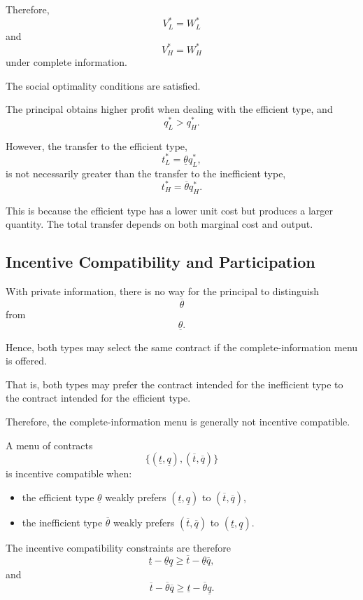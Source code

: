 Therefore,
\[
V^*_L=W^*_L
\]
and
\[
V^*_H=W^*_H
\]
under complete information.

The social optimality conditions are satisfied.

The principal obtains higher profit when dealing with the efficient type, and
\[
q^*_L>q^*_H.
\]

However, the transfer to the efficient type,
\[
t^*_L=\underline{\theta}q^*_L,
\]
is not necessarily greater than the transfer to the inefficient type,
\[
t^*_H=\overline{\theta}q^*_H.
\]

This is because the efficient type has a lower unit cost but produces a larger quantity. The total transfer depends on both marginal cost and output.



\subsection{Incentive Compatibility and Participation}

With private information, there is no way for the principal to distinguish
\[
\overline{\theta}
\]
from
\[
\underline{\theta}.
\]

Hence, both types may select the same contract if the complete-information menu is offered.

That is, both types may prefer the contract intended for the inefficient type to the contract intended for the efficient type.

Therefore, the complete-information menu is generally not incentive compatible.

A menu of contracts
\[
\{(\underline t,\underline q),(\overline t,\overline q)\}
\]
is incentive compatible when:

\begin{itemize}
    \item the efficient type \(\underline{\theta}\) weakly prefers \((\underline t,\underline q)\) to \((\overline t,\overline q)\),
    \item the inefficient type \(\overline{\theta}\) weakly prefers \((\overline t,\overline q)\) to \((\underline t,\underline q)\).
\end{itemize}

The incentive compatibility constraints are therefore
\[
\underline t-\underline{\theta}\underline q
\ge
\overline t-\underline{\theta}\overline q,
\]
and
\[
\overline t-\overline{\theta}\overline q
\ge
\underline t-\overline{\theta}\underline q.
\]

